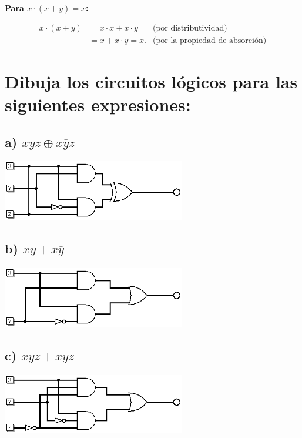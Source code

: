 \documentclass[11pt,letterpaper]{article}
\begin{document}
\textbf{Para \( x \cdot (x + y) = x \):}

\[
\begin{aligned}
x \cdot (x + y) &= x \cdot x + x \cdot y & \text{(por distributividad)} \\
                &= x + x \cdot y = x. & \text{(por la propiedad de absorción)}
\end{aligned}
\]



\section*{Dibuja los circuitos lógicos para las siguientes expresiones:}
\subsection*{a) $xyz \oplus x\overline{y}z$}
\begin{center}
  \includegraphics[width=8cm]{./imagenes/Ej2a.png}
\end{center}

\subsection*{b) $xy+x \overline{y} $}
\begin{center}
  \includegraphics[width=8cm]{./imagenes/Ej2b.png}
\end{center}

\subsection*{c) $xy\overline{z} + x \overline{yz}$}
\begin{center}
  \includegraphics[width=8cm]{./imagenes/Ej2c.png}
\end{center}
\end{document}
